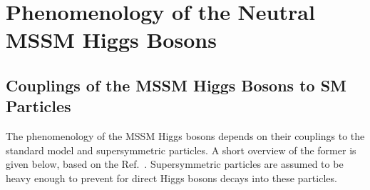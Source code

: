\section{Phenomenology of the Neutral MSSM Higgs Bosons}\label{sec:pheno}

\subsection{Couplings of the MSSM Higgs Bosons to SM Particles}\label{sec:couplings}
The phenomenology of the MSSM Higgs bosons depends on their couplings to the standard model and supersymmetric particles. 
A short overview of the former is given below, based on the Ref.~\cite{Djuadi}. Supersymmetric particles are assumed
to be heavy enough to prevent for direct Higgs bosons decays into these particles. 

